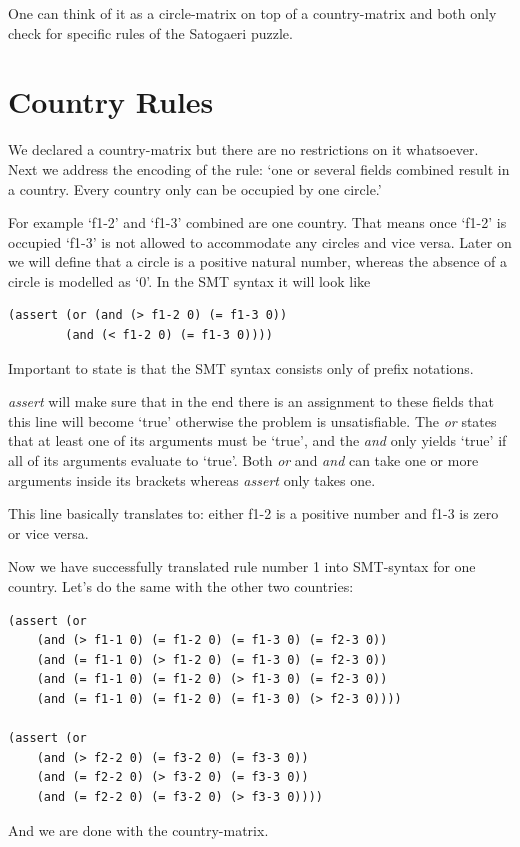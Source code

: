 One can think of it as a circle-matrix on top of a country-matrix and both only check for specific rules of the Satogaeri puzzle.

\section{Country Rules}
We declared a country-matrix but there are no restrictions on it whatsoever. Next we address the encoding of the rule: `one or several fields combined result in a country. Every country only can be occupied by one circle.'

For example `f1-2' and `f1-3' combined are one country. That means once `f1-2' is occupied `f1-3' is not allowed to accommodate any circles and vice versa. Later on we will define that a circle is a positive natural number, whereas the absence of a circle is modelled as `0'. In the SMT syntax it will look like
\begin{lstlisting}
(assert (or (and (> f1-2 0) (= f1-3 0)) 
	    (and (< f1-2 0) (= f1-3 0))))
\end{lstlisting}
Important to state is that the SMT syntax consists only of prefix notations. 

\emph{assert} will make sure that in the end there is an assignment to these fields that this line will become `true' otherwise the problem is unsatisfiable. The \emph{or} states that at least one of its arguments must be `true', and the \emph{and} only yields `true' if all of its arguments evaluate to `true'. Both \emph{or} and \emph{and} can take one or more arguments inside its brackets whereas \emph{assert} only takes one.

This line basically translates to: either f1-2 is a positive number and f1-3 is zero or vice versa.

Now we have successfully translated rule number 1 into SMT-syntax for one country. Let's do the same with the other two countries:

\begin{lstlisting}
(assert (or 
	(and (> f1-1 0) (= f1-2 0) (= f1-3 0) (= f2-3 0)) 
	(and (= f1-1 0) (> f1-2 0) (= f1-3 0) (= f2-3 0)) 
	(and (= f1-1 0) (= f1-2 0) (> f1-3 0) (= f2-3 0)) 
	(and (= f1-1 0) (= f1-2 0) (= f1-3 0) (> f2-3 0))))

(assert (or 
	(and (> f2-2 0) (= f3-2 0) (= f3-3 0)) 
	(and (= f2-2 0) (> f3-2 0) (= f3-3 0)) 
	(and (= f2-2 0) (= f3-2 0) (> f3-3 0))))
\end{lstlisting}
And we are done with the country-matrix.

